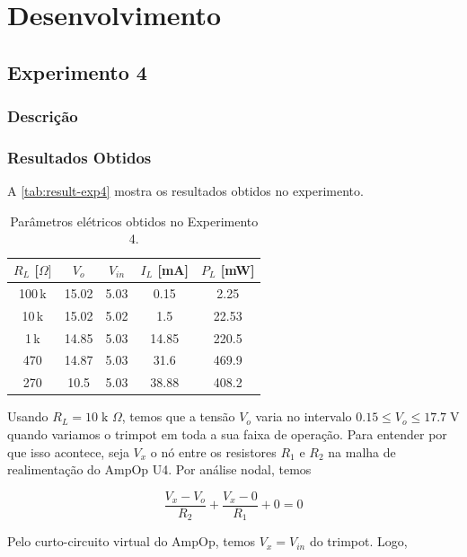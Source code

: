 \documentclass[
	12pt,				%
	oneside,			%
	a4paper,			%
	chapter=TITLE,
	sumario=tradicional,
	english,			%
	brazil				%
]{abntex2}
\newcommand{\un}[1]{\;\text{#1}}
\begin{document}
\lipsum[1-2]

\chapter{Desenvolvimento}

\section{Experimento 4}

\subsection{Descrição}

\subsection{Resultados Obtidos}

A \autoref{tab:result-exp4} mostra os resultados obtidos no experimento.

\begin{table}[htb]
	\caption{Parâmetros elétricos obtidos no Experimento 4.}
	\centering
	\begin{tabular}{c|c|c|c|c}
		\hline
		\textbf{$R_L$ [$\Omega]$} & \textbf{$V_{o}$} & \textbf{$V_{in}$} & \textbf{$I_L$ [mA]} & \textbf{$P_L$ [mW]} \\
		\hline
		100\,k & 15.02 & 5.03 & 0.15 & 2.25 \\
		10\,k  & 15.02 & 5.02 & 1.5 & 22.53 \\
		1\,k   & 14.85 & 5.03 & 14.85 & 220.5 \\
		470    & 14.87 & 5.03 & 31.6 & 469.9 \\
		270    & 10.5 & 5.03 & 38.88 & 408.2 \\
		\hline
	\end{tabular}
	\label{tab:result-exp4}
\end{table}


Usando $R_L = 10 \un{k $\Omega$}$, temos que a tensão $V_o$ varia no intervalo
$0.15 \leq V_o \leq 17.7 \un{V}$ quando variamos o trimpot em toda a sua faixa de operação.
Para entender por que isso acontece, seja $V_x$ o nó entre os resistores $R_1$ e $R_2$ na 
malha de realimentação do AmpOp U4. Por análise nodal, temos  


\[ \frac{V_x - V_o}{R_2} + \frac{V_x - 0}{R_1} + 0 = 0 \]

Pelo curto-circuito virtual do AmpOp, temos $V_x = V_{in}$ do trimpot. Logo,  
\end{document}

